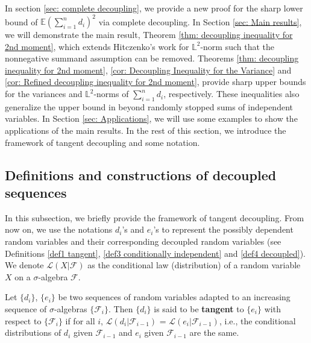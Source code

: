 \documentclass[ECP]{ejpecp} %
\newcommand{\F}{\mathcal{F}}
\newcommand{\Lbb}{\mathbb{L}}
\newcommand{\E}{\mathbb{E}}
\newcommand{\sumn}{\sum\limits_{i=1}^n}
\begin{document}

In section \ref{sec: complete decoupling}, we provide a new proof for the sharp lower bound of $\E (\sumn d_i)^2$ via complete decoupling. In Section \ref{sec: Main results}, we will demonstrate the main result, Theorem \ref{thm: decoupling inequality for 2nd moment}, which extends Hitczenko's work \cite{hitczenko1994sharp} for $\mathbb{L}^2$-norm such that the nonnegative summand assumption can be removed. Theorems \ref{thm: decoupling inequality for 2nd moment}, \ref{cor: Decoupling Inequality for the Variance} and \ref{cor: Refined decoupling inequality for 2nd moment}, provide sharp upper bounds for the variances and $\mathbb{L}^2$-norms of $\sumn d_i$, respectively. These inequalities also generalize the upper bound in \cite{de1992note} beyond randomly stopped sums of independent variables. In Section \ref{sec: Applications}, we will use some examples to show the applications of the main results. In the rest of this section, we introduce the framework of tangent decoupling and some notation.


\subsection{Definitions and constructions of decoupled sequences}
In this subsection, we briefly provide the framework of tangent decoupling. From now on, we use the notations $d_i$'s and $e_i$'s to represent the possibly dependent random variables and their corresponding decoupled random variables (see Definitions \ref{def1 tangent}, \ref{def3 conditionally independent} and \ref{def4 decoupled}). We denote $\mathcal{L}(X|\F)$ as the conditional law (distribution) of a random variable $X$ on a $\sigma$-algebra $\F$.
\begin{definition}
    \label{def1 tangent}
    Let $\{d_i\}$, $\{e_i\}$ be two sequences of random variables adapted to an increasing sequence of $\sigma$-algebras $\{\F_i\}$. Then $\{d_i\}$ is said to be \textbf{tangent} to $\{e_i\}$ with respect to $\{\F_i\}$ if for all $i$, $\mathcal{L}(d_i| \F_{i-1})$ = $\mathcal{L}(e_i|\F_{i-1})$, i.e., the conditional distributions of $d_i$ given $\F_{i-1}$ and $e_i$ given $\F_{i-1}$ are the same.
\end{definition}
\end{document}
